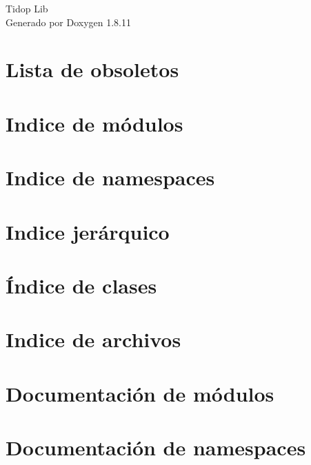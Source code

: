 \documentclass[twoside]{book}
\newcommand{\+}{\discretionary{\mbox{\scriptsize$\hookleftarrow$}}{}{}}
\newcommand{\clearemptydoublepage}{%
  \newpage{\pagestyle{empty}\cleardoublepage}%
}
\begin{document}
\hypersetup{pageanchor=false,
             bookmarksnumbered=true,
             pdfencoding=unicode
            }
\begin{titlepage}
\vspace*{7cm}
\begin{center}%
{\Large Tidop Lib }\\
\vspace*{1cm}
{\large Generado por Doxygen 1.8.11}\\
\end{center}
\end{titlepage}
\clearemptydoublepage
\tableofcontents
\clearemptydoublepage
{}
\hypersetup{pageanchor=true}

\chapter{Lista de obsoletos}
\label{deprecated}
\hypertarget{deprecated}{}

\chapter{Indice de módulos}

\chapter{Indice de namespaces}

\chapter{Indice jerárquico}

\chapter{Índice de clases}

\chapter{Indice de archivos}

\chapter{Documentación de módulos}







\chapter{Documentación de namespaces}

\end{document}
